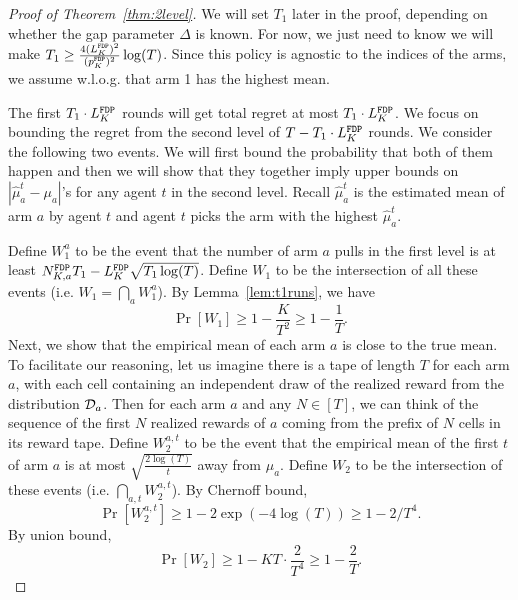 \begin{proof}[Proof of Theorem~\ref{thm:2level}]
  We will set $T_1$ later in the proof, depending on whether the gap
  parameter $\Delta$ is known. For now, we just need to know we will
  make $T_1 \geq \frac{4(L^\mathtt{FDP}_K)^2}{(p^\mathtt{FDP}_K)^2}\log(T)$. Since this policy is
  agnostic to the indices of the arms, we assume w.l.o.g. that arm 1
  has the highest mean.

  The first $T_1 \cdot L^\mathtt{FDP}_K$ rounds will get total regret at most
  $T_1 \cdot L^\mathtt{FDP}_K$.  We focus on bounding the regret from the second
  level of $T - T_1 \cdot L^\mathtt{FDP}_K$ rounds. We consider the following two
   events. We will first bound the probability that both of them
  happen and then we will show that they together imply upper bounds
  on $|\hat{\mu}^t_a - \mu_a|$'s for any agent $t$ in the second
  level. Recall $\hat{\mu}^t_a$ is the estimated mean of arm $a$ by
  agent $t$ and agent $t$ picks the arm with the highest
  $\hat{\mu}^t_a$.

  Define $W_1^a$ to be the event that the number of arm $a$ pulls in
  the first level is at least $N^\mathtt{FDP}_{K,a} T_1- L^\mathtt{FDP}_K \sqrt{T_1\log(T)}$.
Define $W_1$ to be the intersection of all these events (i.e. $W_1 = \bigcap_{a}W_1^a$). By Lemma~\ref{lem:t1runs}, we have
\[
\Pr[W_1] \geq 1- \frac{K}{T^2} \geq 1 - \frac{1}{T}.
\]
  Next, we show that the empirical mean of
each arm $a$ is close to the true mean. To facilitate our reasoning,
let us imagine there is a tape of length $T$ for each arm $a$, with
each cell containing an independent draw of the realized reward from
the distribution $\mathcal{D}_a$. Then for each arm $a$ and any $N\in [T]$, we
can think of the sequence of the first $N$ realized rewards of $a$
coming from the prefix of $N$ cells in its reward tape. Define
$W^{a,t}_2$ to be the event that the empirical mean of the first $t$
 of arm $a$ is at most
$\sqrt{\frac{2\log(T)}{t}}$ away from $\mu_a$. Define $W_2$ to be the
intersection of these events (i.e.  $\bigcap_{a,t} W^{a,t}_2$).  By
Chernoff bound,
\[
\Pr[W^{a,t}_2] \geq 1 - 2\exp(-4\log(T)) \geq 1-2/T^4.
\]
By union bound,
\[
\Pr[W_2] \geq 1 - KT \cdot \frac{2}{T^4} \geq 1 - \frac{2}{T}.
\]




\end{proof}
